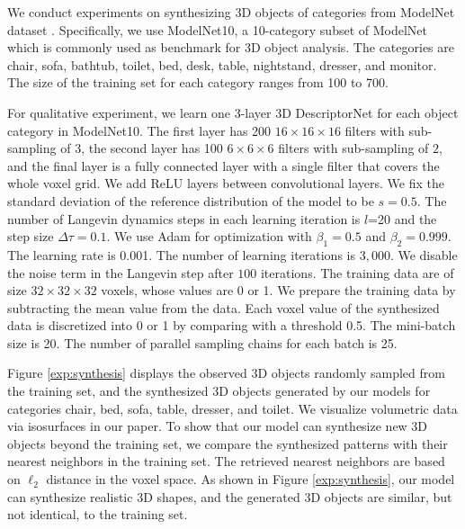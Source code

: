\documentclass[10pt,twocolumn,letterpaper]{article}
\begin{document}
\begin{figure*}[h]
	\caption{Generating 3D objects. Each row displays one experiment, where the first three 3D objects are some observed examples, columns 4, 5, 6, 7, 8, and 9 are 6 of the synthesized 3D objects sampled from the learned model by Langevin dynamics. For the last four synthesized objects (shown in columns 6, 7, 8, and 9), their nearest neighbors retrieved from the training set are shown in columns 10, 11, 12, and 13. }	
	\label{exp:synthesis}
\end{figure*}


We conduct experiments on synthesizing 3D objects of categories from ModelNet dataset \cite{wu20153d}. Specifically, we use ModelNet10, a 10-category subset of ModelNet which is commonly used as benchmark for 3D object analysis. The categories are chair, sofa, bathtub, toilet, bed, desk, table, nightstand, dresser, and monitor. The size of the training set for each category ranges from 100 to 700.

For qualitative experiment, we learn one 3-layer 3D DescriptorNet for each object category in ModelNet10. The first layer has 200 $16\times16\times16$ filters with sub-sampling of 3, the second layer has 100 $6\times6\times6$ filters with sub-sampling of $2$, and the final layer is a fully connected layer with a single filter that covers the whole voxel grid. We add ReLU layers between convolutional layers. We fix the standard deviation of the reference distribution of the model to be $s=0.5$. The number of Langevin dynamics steps in each learning iteration is $l$=20 and the step size $\Delta \tau =0.1$. We use Adam \cite{kingma2015adam} for optimization with $\beta_1=0.5$ and $\beta_2=0.999$. The learning rate is 0.001. The number of learning iterations is $3,000$. We disable the noise term in the Langevin step after $100$ iterations. The training data are of size $32 \times 32 \times 32$ voxels, whose values are 0 or 1. We prepare the training data by subtracting the mean value from the data. Each voxel value of the synthesized data is discretized into 0 or 1 by comparing with a threshold 0.5. The mini-batch size is 20. The number of parallel sampling chains for each batch is 25.

Figure \ref{exp:synthesis} displays the observed 3D objects randomly sampled from the training set, and the synthesized 3D objects generated by our models for categories chair, bed, sofa, table, dresser, and toilet. 
We visualize volumetric data via isosurfaces in our paper. To show that our model can synthesize new 3D objects beyond the training set, we compare the synthesized patterns with their nearest neighbors in the training set. The retrieved nearest neighbors are based on $\ell_2$ distance in the voxel space. As shown in Figure \ref{exp:synthesis}, our model can synthesize realistic 3D shapes, and the generated 3D objects are similar, but not identical, to the training set.  
\end{document}
